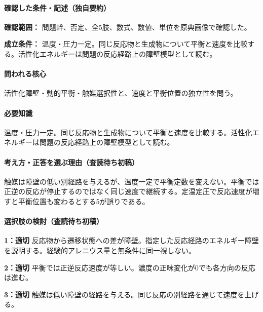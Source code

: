 \paragraph{確認した条件・記述（独自要約）}\mbox{}\par

\noindent\textbf{確認範囲：} 問題幹、否定、全5肢、数式、数値、単位を原典画像で確認した。\par

\noindent\textbf{成立条件：} 温度・圧力一定。同じ反応物と生成物について平衡と速度を比較する。活性化エネルギーは問題の反応経路上の障壁模型として読む。\par

\paragraph{問われる核心} 活性化障壁・動的平衡・触媒選択性と、速度と平衡位置の独立性を問う。

\paragraph{必要知識} 温度・圧力一定。同じ反応物と生成物について平衡と速度を比較する。活性化エネルギーは問題の反応経路上の障壁模型として読む。

\paragraph{考え方・正答を選ぶ理由（査読待ち初稿）} 触媒は障壁の低い別経路を与えるが、温度一定で平衡定数を変えない。平衡では正逆の反応が停止するのではなく同じ速度で継続する。定温定圧で反応速度が増すと平衡位置も変わるとする5が誤りである。

\paragraph{選択肢の検討（査読待ち初稿）}\mbox{}\par

\noindent\textbf{1：適切} 反応物から遷移状態への差が障壁。指定した反応経路のエネルギー障壁を説明する。経験的アレニウス量と無条件に同一視しない。\par

\noindent\textbf{2：適切} 平衡では正逆反応速度が等しい。濃度の正味変化が0でも各方向の反応は進む。\par

\noindent\textbf{3：適切} 触媒は低い障壁の経路を与える。同じ反応の別経路を通じて速度を上げる。\par

